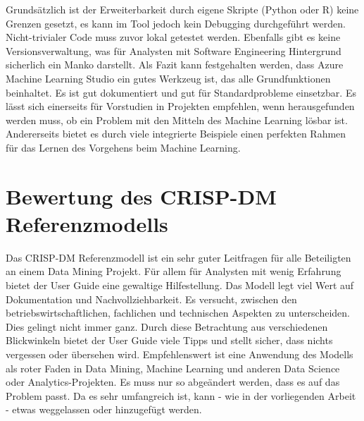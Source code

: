 Grundsätzlich ist der Erweiterbarkeit durch eigene Skripte (Python oder R) keine Grenzen gesetzt, es kann im Tool jedoch kein Debugging durchgeführt werden. Nicht-trivialer Code muss zuvor lokal getestet werden. Ebenfalls gibt es keine Versionsverwaltung, was für Analysten mit Software Engineering Hintergrund sicherlich ein Manko darstellt.\newline
Als Fazit kann festgehalten werden, dass Azure Machine Learning Studio ein gutes Werkzeug ist, das alle Grundfunktionen beinhaltet. Es ist gut dokumentiert und gut für Standardprobleme einsetzbar. Es lässt sich einerseits für Vorstudien in Projekten empfehlen, wenn herausgefunden werden muss, ob ein Problem mit den Mitteln des Machine Learning lösbar ist. Andererseits bietet es durch viele integrierte Beispiele einen perfekten Rahmen für das Lernen des Vorgehens beim Machine Learning.

\section{Bewertung des CRISP-DM Referenzmodells}\label{sec:BeswertungCrisp}
Das CRISP-DM Referenzmodell ist ein sehr guter Leitfragen für alle Beteiligten an einem Data Mining Projekt. Für allem für Analysten mit wenig Erfahrung bietet der User Guide eine gewaltige Hilfestellung. Das Modell legt viel Wert auf Dokumentation und Nachvollziehbarkeit. Es versucht, zwischen den betriebswirtschaftlichen, fachlichen und technischen Aspekten zu unterscheiden. Dies gelingt nicht immer ganz. Durch diese Betrachtung aus verschiedenen Blickwinkeln bietet der User Guide viele Tipps und stellt sicher, dass nichts vergessen oder übersehen wird.\newline
Empfehlenswert ist eine Anwendung des Modells als roter Faden in Data Mining, Machine Learning und anderen Data Science oder Analytics-Projekten. Es muss nur so abgeändert werden, dass es auf das Problem passt. Da es sehr umfangreich ist, kann - wie in der vorliegenden Arbeit - etwas weggelassen oder hinzugefügt werden.

